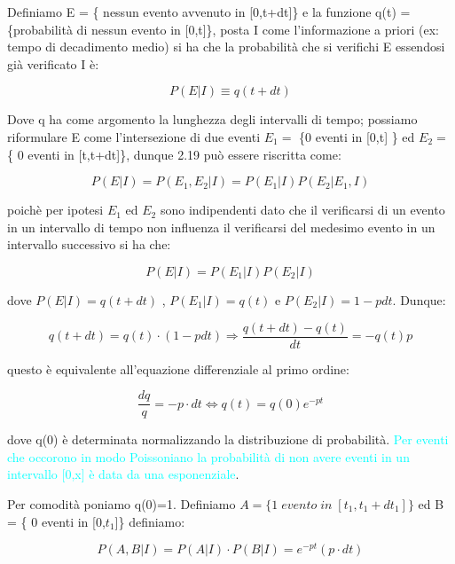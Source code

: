 Definiamo E = \{ nessun evento avvenuto in [0,t+dt]\} e la funzione q(t) = \{probabilit\`{a} di nessun evento in [0,t]\}, posta I come l'informazione a priori (ex: tempo di decadimento medio) si ha che la probabilit\`{a} che si verifichi E essendosi gi\`{a} verificato I \`{e}:

\begin{equation}
	P(E\vert I) \equiv q(t+dt)
\end{equation} 

Dove q ha come argomento la lunghezza degli intervalli di tempo; possiamo riformulare E come l'intersezione di due eventi $E_1 =$ \{0 eventi in [0,t] \} ed $E_2 = $ \{ 0 eventi in [t,t+dt]\}, dunque 2.19 pu\`{o} essere riscritta come:

\begin{equation*}
	P(E \vert I) = P(E_1,E_2 \vert I) = P(E_1 \vert I)P(E_2 \vert E_1 ,I)
\end{equation*}

poich\`{e} per ipotesi $E_{1}$ ed $E_{2}$ sono indipendenti dato che il verificarsi di un evento in un intervallo di tempo non influenza il verificarsi del medesimo evento in un intervallo successivo si ha che:

\begin{equation}
	P(E \vert I) = P(E_1 \vert I)P(E_2 \vert I)
\end{equation}

dove $P(E \vert I) = q(t+dt)$ , $P(E_1 \vert I) = q(t)$ e $P(E_2 \vert I) = 1-pdt$. Dunque:

\begin{equation}
	q(t+dt) = q(t)\cdot (1-pdt) \Rightarrow \dfrac{q(t+dt)-q(t)}{dt} = -q(t)p
\end{equation}

questo \`{e} equivalente all'equazione differenziale al primo ordine:

\begin{equation*}
	\dfrac{dq}{q} = -p \cdot dt \iff q(t) = q(0)e^{-pt}
\end{equation*}

dove q(0) \`{e} determinata normalizzando la distribuzione di probabilit\`{a}. \textcolor{cyan}{Per eventi che occorono in modo Poissoniano la probabilit\`{a} di non avere eventi in un intervallo [0,x] \`{e} data da una esponenziale}.

Per comodit\`{a} poniamo q(0)=1. Definiamo $A = \{ 1 \; evento \; in \; [t_1,t_1+dt_1] \}$ ed B = \{ 0 eventi in [0,$t_1$]\} definiamo:

\begin{equation}
	P(A,B \vert I) = P(A \vert I) \cdot P(B \vert I) = e^{-pt}(p \cdot dt)
\end{equation} 

